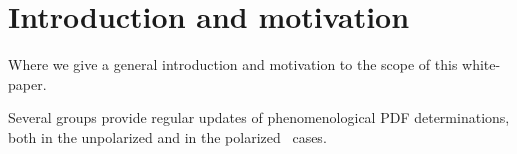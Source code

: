 \section{Introduction and motivation}

Where we give a general introduction and motivation
to the scope of this white-paper.

Several groups provide regular updates of
phenomenological PDF determinations, both
in the unpolarized and in the polarized~\cite{Nocera:2014gqa} cases.
